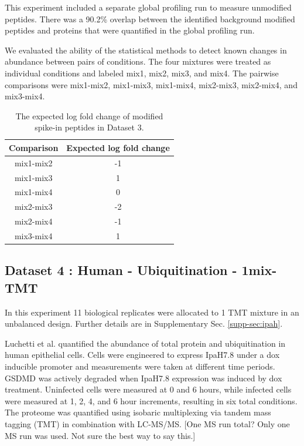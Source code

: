 \documentclass[mcp]{article}
\numberwithin{table}{section}
\def\todo#1{{\color{red}[#1]}}
\begin{document}
\medskip {} This experiment included a separate global profiling run to measure unmodified peptides. There was a 90.2\% overlap between the identified background modified peptides and proteins that were quantified in the global profiling run.

\medskip {} We evaluated the ability of the statistical methods to detect known changes in abundance between pairs of conditions. The four mixtures were treated as individual conditions and labeled mix1, mix2, mix3, and mix4. The pairwise comparisons were mix1-mix2, mix1-mix3, mix1-mix4, mix2-mix3, mix2-mix4, and mix3-mix4. 


\begin{table}[h!]
\centering
\begin{tabular}{| c | c |}
\hline
 Comparison & Expected log fold change\\ [0.5ex]
 \hline\hline
 mix1-mix2 & -1\\
 \hline
 mix1-mix3 & 1\\
\hline
 mix1-mix4 & 0\\
\hline
 mix2-mix3 & -2\\
\hline
 mix2-mix4 & -1\\
\hline
 mix3-mix4 & 1\\
\hline
\end{tabular}
\caption{The expected log fold change of modified spike-in peptides in Dataset 3.}
\label{table:spikein_fold_change}
\end{table}


\subsection*{Dataset 4 : Human - Ubiquitination - 1mix-TMT}
\label{sec:exp_proc_dataset4}
In this experiment 11 biological replicates were allocated to 1 TMT mixture in an unbalanced design. Further details are in Supplementary Sec. \ref{supp-sec:ipah}. 


\medskip {} Luchetti et al. \cite{LUCHETTI2021} quantified the abundance of total protein and ubiquitination in human epithelial cells. Cells were engineered to express IpaH7.8 under a dox inducible promoter and measurements were taken at different time periods. GSDMD was actively degraded when IpaH7.8 expression was induced by dox treatment. Uninfected cells were measured at 0 and 6 hours, while infected cells were measured at 1, 2, 4, and 6 hour increments, resulting in six total conditions. The proteome was quantified using isobaric multiplexing via tandem mass tagging (TMT) in combination with LC-MS/MS. \todo{One MS run total? Only one MS run was used. Not sure the best way to say this.}
\end{document}

